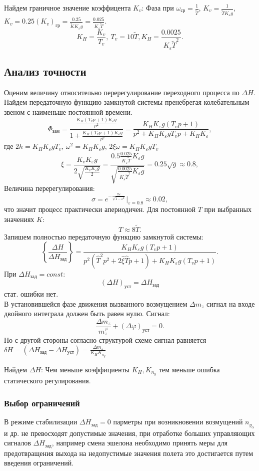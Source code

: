 \documentclass{article}
\begin{document}
Найдем граничное значение коэффицента $K_v$:
Фаза при $\omega_\text{ср} = \frac{1}{\tilde{T}} $, $K_v = \frac{1}{\tilde{T} K_\varepsilon g}$, $K_v = 0.25 (K_v)_\text{гр} = \frac{0.25}{\tilde{K}  K_\varepsilon g} = \frac{0.025}{K_\varepsilon \tilde{T}}$.
\[
	K_H = \frac{K_v}{T_v}, \ T_v = 10 \tilde{T}, K_H = \frac{0.0025}{K_\varepsilon \tilde{T}^2}
	.\]

\subsection{Анализ точности}
Оценим величину относительно перерегулирование переходного процесса по $\Delta H$. Найдем передаточную функцию замкнутой системы пренебрегая колебательным звеном с наименьше постоянной времени.
\[
	\Phi_\text{зам} = \frac{\frac{K_H(T_v p + 1) K_\varepsilon g}{p^2}}{1 + \frac{K_H(T_v p + 1) K_\varepsilon g}{p^2}} = \frac{K_H K_\varepsilon g(T_v p + 1)}{ p^2 +  K_H K_\varepsilon g T_v p +  K_H K_\varepsilon}
	,\]
где $2h = K_H K_\varepsilon g T_v$, $\omega^2 = K_H K_\varepsilon g$, $2 \xi \omega = K_H K_\varepsilon g T_v$
\[
	\xi = \frac{K_v K_\varepsilon g}{2 \sqrt{\frac{K_v K_\varepsilon g}{2}}} = \frac{0.5 \frac{0.025}{K_\varepsilon \tilde{T}} K_\varepsilon g}{\sqrt{\frac{0.0025}{K_\varepsilon \tilde{T}^2} K_\varepsilon  g}} = 0.25 \sqrt{g} \approx 0.8,
\]
Величина перерегулирования:
\[
	\sigma = e^{- \frac{\pi \varepsilon}{\sqrt{1 - \varepsilon^2}}} |_{\varepsilon = 0.8} \approx 0.02,
\]
что значит процесс практически апериодичен. Для постоянной $T$ при выбранных значениях $K$:
\[
	T \approx 8 \tilde{T}
	.\]
Запишем полностью передаточную функцию замкнутой системы:
\[
	\left\{ \frac{\Delta H }{\Delta H_\text{зад}} \right\}  = \frac{K_H K_\varepsilon g (T_v p + 1)}{p^2 (\hat{T}^2 p^2 + 2 \hat{\xi} \hat{T}p + 1) + K_H K_\varepsilon g (T_v p +1)}.
\]
При $\Delta H_\text{зад} = const$:
\[
	(\Delta H)_\text{уст} = \Delta H_\text{зад}
\]
стат. ошибки нет.\\
В установившейся фазе движения вызванного возмущением $ \Delta m_z $ сигнал на входе двойного интеграла должен быть равен нулю.
Сигнал:
\[
	\frac{\Delta m_z}{m_z^\varphi} + (\Delta \varphi)_\text{уст} = 0   
	.\]
Но с другой стороны согласно структурой схеме сигнал равняется $\delta H = (\Delta H_\text{зад} - \Delta H_\text{уст}) = \frac{\Delta m_z}{K_H K_{n_y}}$

Найдем $\Delta H$:
Чем меньше коэффициенты $K_H, K_{n_y}$ тем меньше ошибка статического регулирования.

\subsubsection{Выбор ограничений}
В режиме стабилизации $\Delta H_\text{зад} = 0$ парметры при возникновении возмущений $n_{y_\alpha}$ и др. не превосходят допустимые значения, при отработке больших управляющих сигналов $\Delta H_\text{зад}$, например смена эшелона необходимо принять меры для предотвращения выхода на недопустимые значения полета это достигается путем введения ограничений.    
\end{document}
